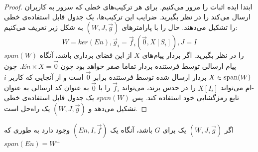 \begin{proof}
    ابتدا ایده اثبات را مرور می‌کنیم. برای هر 
    \lpicod
    ترکیب‌های خطی که سرور به کاربران ارسال می‌کند را در نظر بگیرید. ضرایب این ترکیب‌ها، یک جدول قابل استفاده‌ی خطی را تشکیل می‌دهند.
حال
    \lpsicod
    را با پارامترهای
    $(W, J, \overrightarrow{g})$
     به شکل زیر تعریف می‌کنیم:
     $$W = ker(En), \overrightarrow{g}_i = \overrightarrow{f}_i(\overrightarrow{0}, X[S_i]), J = I$$
    $span(W)$
     را در نظر بگیرید. اگر بردار پیام‌های
     $X$
      از این فضای برداری باشد، آنگاه پیام ارسالی توسط فرستنده بردار تماما صفر خواهد بود چون 
      $En \times X = \overrightarrow{0}$.
      چون
      $X \in \operatorname{span}(W)$
       بردار ارسال شده توسط فرستنده برابر
      $\overrightarrow{0}$
       است و از آنجایی که کاربر 
       $i$-ام
        می‌تواند 
       $X[I_i]$
        را در 
        \picod
         حدس بزند، می‌تواند
         $\overrightarrow{f}_i$ 
        را با 
        $\overrightarrow{0}$ 
        به عنوان کد ارسالی به عنوان تابع رمزگشایی خود استفاده کند. پس 
        $span(W)$
         یک جدول قابل استفاده‌ی خطی تشکیل می‌دهد و 
        $(W, J, \overrightarrow{g})$ 
        یک راه‌حل است.
\end{proof}

\begin{lemma}
    اگر
     $(W, J, \overrightarrow{g})$
      یک 
      \lpsicod
       برای $G$ باشد، آنگاه یک
       \lpicod
        $(En, I, \overrightarrow{f})$
        وجود دارد به طوری که
         $span(En) = W^{\bot}$
\end{lemma}

